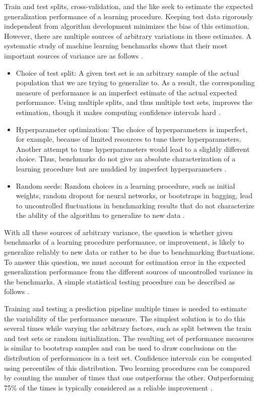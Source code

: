 \documentclass[../../../main.tex]{subfiles}
\begin{document}
Train and test splits, cross-validation, and the like seek to estimate the expected generalization performance of a learning procedure. Keeping test data rigorously independent from algorithm development minimizes the bias of this estimation. However, there are multiple sources of arbitrary variations in these estimates. A systematic study of machine learning benchmarks shows that their most important sources of variance are as follows \autocite{Varoquaux2023}.

\begin{itemize}
\item Choice of test split: A given test set is an arbitrary sample of the actual population that we are trying to generalize to. As a result, the corresponding measure of performance is an imperfect estimate of the actual expected performance. Using multiple splits, and thus multiple test sets, improves the estimation, though it makes computing confidence intervals hard \autocite{Varoquaux2023}.

\item Hyperparameter optimization: The choice of hyperparameters is imperfect, for example, because of limited resources to tune there hyperparameters. Another attempt to tune hyperparameters would lead to a slightly different choice. Thus, benchmarks do not give an absolute characterization of a learning procedure but are muddied by imperfect hyperparameters \autocite{Varoquaux2023}.

\item Random seeds: Random choices in a learning procedure, such as initial weights, random dropout for neural networks, or bootstraps in bagging, lead to uncontrolled fluctuations in benchmarking results that do not characterize the ability of the algorithm to generalize to new data \autocite{Varoquaux2023}.
\end{itemize}

With all these sources of arbitrary variance, the question is whether given benchmarks of a learning procedure performance, or improvement, is likely to generalize reliably to new data or rather to be due to benchmarking fluctuations. To answer this question, we must account for estimation error in the expected generalization performance from the different sources of uncontrolled variance in the benchmarks. A simple statistical testing procedure can be described as follows \autocite{Varoquaux2023}.

Training and testing a prediction pipeline multiple times is needed to estimate the variability of the performance measure. The simplest solution is to do this several times while varying the arbitrary factors, such as split between the train and test sets or random initialization. The resulting set of performance measures is similar to bootstrap samples and can be used to draw conclusions on the distribution of performances in a test set. Confidence intervals can be computed using percentiles of this distribution. Two learning procedures can be compared by counting the number of times that one outperforms the other. Outperforming 75\% of the times is typically considered as a reliable improvement \autocite{Varoquaux2023}.
\end{document}

